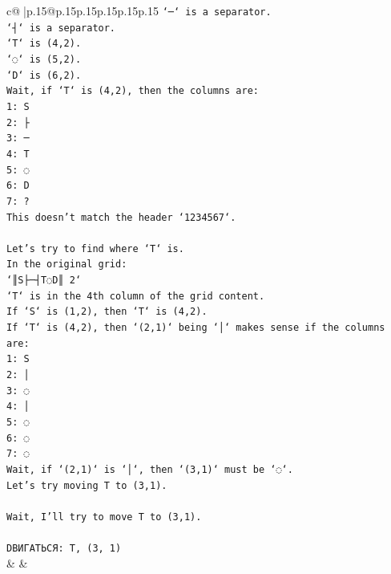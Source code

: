 \documentclass{article}
\begin{document}
{\begin{supertabular}{c@{$\;$}|p{.15\linewidth}@{}p{.15\linewidth}p{.15\linewidth}p{.15\linewidth}p{.15\linewidth}p{.15\linewidth}}
{{{\texttt{`─` is a separator.} \\
\texttt{`┤` is a separator.} \\
\texttt{`T` is (4,2).} \\
\texttt{`◌` is (5,2).} \\
\texttt{`D` is (6,2).} \\
\texttt{Wait, if `T` is (4,2), then the columns are:} \\
\texttt{1: S} \\
\texttt{2: ├} \\
\texttt{3: ─} \\
\texttt{4: T} \\
\texttt{5: ◌} \\
\texttt{6: D} \\
\texttt{7: ?} \\
\texttt{This doesn't match the header `1234567`.} \\
\\ 
\texttt{Let's try to find where `T` is.} \\
\texttt{In the original grid:} \\
\texttt{`║S├─┤T◌D║ 2`} \\
\texttt{`T` is in the 4th column of the grid content.} \\
\texttt{If `S` is (1,2), then `T` is (4,2).} \\
\texttt{If `T` is (4,2), then `(2,1)` being `│` makes sense if the columns are:} \\
\texttt{1: S} \\
\texttt{2: │} \\
\texttt{3: ◌} \\
\texttt{4: │} \\
\texttt{5: ◌} \\
\texttt{6: ◌} \\
\texttt{7: ◌} \\
\texttt{Wait, if `(2,1)` is `│`, then `(3,1)` must be `◌`.} \\
\texttt{Let's try moving T to (3,1).} \\
\\ 
\texttt{Wait, I'll try to move T to (3,1).} \\
\\ 
\texttt{DВИГАТЬСЯ: T, (3, 1)} \\
            }
        }
    }
    & & \\ \\


\end{supertabular}}
\end{document}
